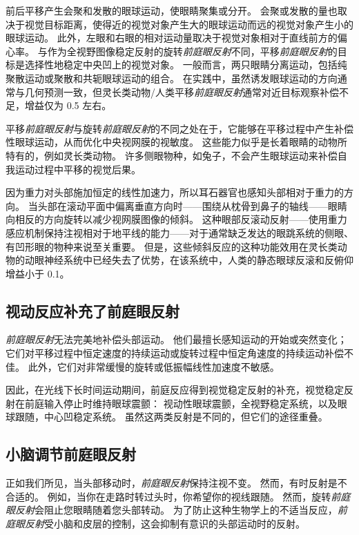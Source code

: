 前后平移产生会聚和发散的眼球运动，使眼睛聚集或分开。
会聚或发散的量也取决于视觉目标距离，使得近的视觉对象产生大的眼球运动而远的视觉对象产生小的眼球运动。
此外，左眼和右眼的相对运动量取决于视觉对象相对于直线前方的偏心率。
与作为全视野图像稳定反射的旋转\textit{前庭眼反射}不同，平移\textit{前庭眼反射}的目标是选择性地稳定中央凹上的视觉对象。
一般而言，两只眼睛分离运动，包括纯聚散运动或聚散和共轭眼球运动的组合。
在实践中，虽然诱发眼球运动的方向通常与几何预测一致，但灵长类动物/人类平移\textit{前庭眼反射}通常对近目标观察补偿不足，增益仅为 0.5 左右。


平移\textit{前庭眼反射}与旋转\textit{前庭眼反射}的不同之处在于，它能够在平移过程中产生补偿性眼球运动，从而优化中央视网膜的视敏度。
这些能力似乎是长着眼睛的动物所特有的，例如灵长类动物。
许多侧眼物种，如兔子，不会产生眼球运动来补偿自我运动过程中平移的视觉后果。


因为重力对头部施加恒定的线性加速力，所以耳石器官也感知头部相对于重力的方向。
当头部在滚动平面中偏离垂直方向时——围绕从枕骨到鼻子的轴线——眼睛向相反的方向旋转以减少视网膜图像的倾斜。
这种眼部反滚动反射——使用重力感应机制保持注视相对于地平线的能力——对于通常缺乏发达的眼跳系统的侧眼、有凹形眼的物种来说至关重要。
但是，这些倾斜反应的这种功能效用在灵长类动物的动眼神经系统中已经失去了优势，在该系统中，人类的静态眼球反滚和反俯仰增益小于 0.1。



\subsection{视动反应补充了前庭眼反射}

\textit{前庭眼反射}无法完美地补偿头部运动。
他们最擅长感知运动的开始或突然变化；
它们对平移过程中恒定速度的持续运动或旋转过程中恒定角速度的持续运动补偿不佳。
此外，它们对非常缓慢的旋转或低振幅线性加速度不敏感。


因此，在光线下长时间运动期间，前庭反应得到视觉稳定反射的补充，视觉稳定反射在前庭输入停止时维持眼球震颤：
视动性眼球震颤，全视野稳定系统，以及眼球跟随，中心凹稳定系统。
虽然这两类反射是不同的，但它们的途径重叠。



\subsection{小脑调节前庭眼反射}

正如我们所见，当头部移动时，\textit{前庭眼反射}保持注视不变。
然而，有时反射是不合适的。
例如，当你在走路时转过头时，你希望你的视线跟随。
然而，旋转\textit{前庭眼反射}会阻止您眼睛随着您头部转动。
为了防止这种生物学上的不适当反应，\textit{前庭眼反射}受小脑和皮层的控制，这会抑制有意识的头部运动时的反射。


